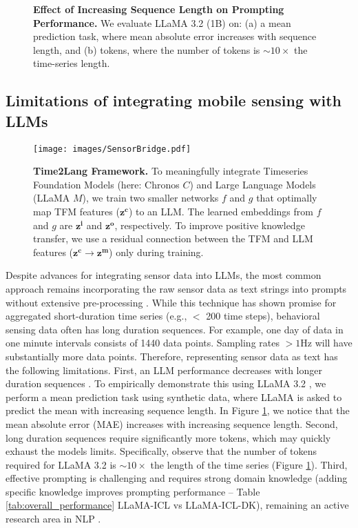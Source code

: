 \begin{figure}
    \centering
    \caption{\textbf{Effect of Increasing Sequence Length on Prompting Performance.} We evaluate LLaMA 3.2 (1B) on: (a) a mean prediction task, where mean absolute error increases with sequence length, and (b) tokens, where the number of tokens is $\sim 10\times$ the time-series length.} 
    \label{fig:limitations}
\end{figure}

\subsection{Limitations of integrating mobile sensing with LLMs} \label{sec:limitations}


\begin{figure*}
    \centering
    \texttt{[image: images/SensorBridge.pdf]}
    \caption{\textbf{Time2Lang Framework.} To meaningfully integrate Timeseries Foundation Models  (here: Chronos $C$) and Large Language Models (LLaMA $M$), we train two smaller networks $f$ and $g$ that optimally map TFM features ($\mathbf{z^c}$) to an LLM. The learned embeddings from $f$ and $g$ are $\mathbf{z^i}$ and $\mathbf{z^o}$, respectively. To improve positive knowledge transfer, we use a residual connection between the TFM and LLM features ($\mathbf{z^c} \rightarrow \mathbf{z^m}$) only during training.}
    \label{fig:Time2Lang}
\end{figure*}

Despite advances for integrating sensor data into LLMs, the most common approach remains incorporating the raw sensor data as text strings into prompts without extensive pre-processing \citep{kim2024health, liu2023large, xu2024penetrative}. While this technique has shown promise for aggregated short-duration time series (e.g., $<$ 200 time steps), behavioral sensing data often has long duration sequences. For example, one day of data in one minute intervals consists of 1440 data points. Sampling rates $>1$Hz will have substantially more data points. Therefore, representing sensor data as text has the following limitations. First, an LLM performance decreases with longer duration sequences \citep{yoon2024my}. To empirically demonstrate this using LLaMA 3.2 \citep{dubey2024llama}, we perform a mean prediction task using synthetic data, where LLaMA is asked to predict the mean with increasing sequence length. In Figure \ref{fig:limitations}, we notice that the mean absolute error (MAE) increases with increasing sequence length. Second, long duration sequences require significantly more tokens, which may quickly exhaust the models limits. Specifically, observe that the number of tokens required for LLaMA 3.2 is $\sim 10\times$ the length of the time series (Figure \ref{fig:limitations}). Third, effective prompting is challenging and requires strong domain knowledge (adding specific knowledge improves prompting performance -- Table \ref{tab:overall_performance} LLaMA-ICL vs LLaMA-ICL-DK), remaining an active research area in NLP \citep{zamfirescu2023johnny, bommasani2021opportunities, liu2023pre}.

